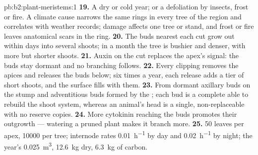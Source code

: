 \begin{solution}{pb:b2:plant-meristems:1}
\textbf{19.} A dry or cold year; or a defoliation by insects, frost
or fire. A climate cause narrows the same rings in every tree of the
region and correlates with weather records; damage affects one tree
or stand, and frost or fire leaves anatomical scars in the ring.
\textbf{20.} The buds nearest each cut grow out within days into
several shoots; in a month the tree is bushier and denser, with more
but shorter shoots.
\textbf{21.} Auxin on the cut replaces the apex's signal: the buds
stay dormant and no branching follows.
\textbf{22.} Every clipping removes the apices and releases the buds
below; six times a year, each release adds a tier of short shoots,
and the surface fills with them.
\textbf{23.} From dormant axillary buds on the stump and adventitious
buds formed by the ; each bud is a complete  able to
rebuild the shoot system, whereas an animal's head is a single,
non-replaceable  with no reserve copies.
\textbf{24.} More cytokinin reaching the buds promotes their outgrowth
--- watering a pruned plant makes it branch more.
\textbf{25.} 50 leaves per apex, \num{10000} per tree; internode rates
\qty{0.01}{h^{-1}} by day and \qty{0.02}{h^{-1}} by night; the year's
 \qty{0.025}{m^3}, \qty{12.6}{kg} dry, \qty{6.3}{kg} of carbon.
\end{solution}
